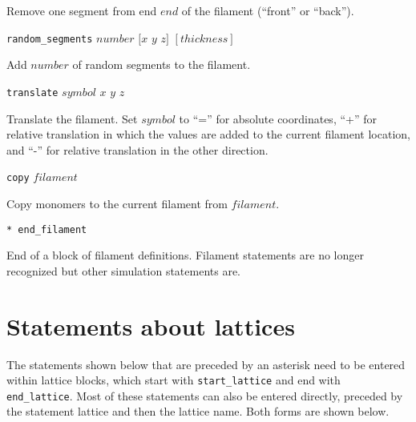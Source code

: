 \documentclass {scrbook}
\newcommand {\ttt} {\texttt}
\begin{document}
\begin{description}
Remove one segment from end $end$ of the filament (``front'' or ``back'').

\item{\ttt{random\_segments} $number$ $[x$ $y$ $z]$ $[thickness]$}

Add $number$ of random segments to the filament.

\item{\ttt{translate} $symbol$ $x$ $y$ $z$}

Translate the filament. Set $symbol$ to ``='' for absolute coordinates, ``+'' for relative translation in which the values are added to the current filament location, and ``-'' for relative translation in the other direction.

\item{\ttt{copy} $filament$}

Copy monomers to the current filament from $filament$.

\item{\ttt{* end\_filament}}

End of a block of filament definitions. Filament statements are no longer recognized but other simulation statements are.

\end{description}



\section{Statements about lattices}

The statements shown below that are preceded by an asterisk need to be entered within lattice blocks, which start with \ttt{start\_lattice} and end with \ttt{end\_lattice}. Most of these statements can also be entered directly, preceded by the statement lattice and then the lattice name. Both forms are shown below.
\end{document}
